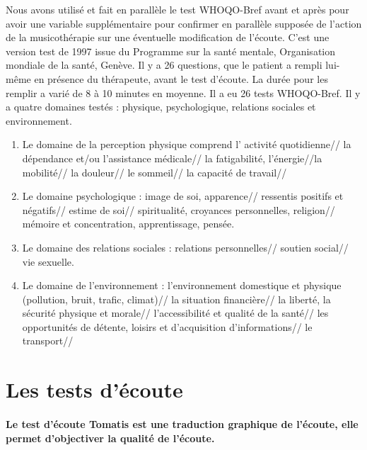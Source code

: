 Nous avons utilisé et fait en parallèle le test WHOQO-Bref avant et
après pour avoir une variable supplémentaire pour confirmer en
parallèle supposée de l'action de la musicothérapie sur une éventuelle modification de l'écoute.  C'est une
version test de 1997 issue du Programme sur la santé mentale,
Organisation mondiale de la santé, Genève. Il y a 26 questions, que le
patient a rempli lui-même en présence du thérapeute, avant le test
d'écoute. La durée pour les remplir a varié de 8 à 10 minutes en
moyenne.  Il a eu 26 tests WHOQO-Bref.
Il y a quatre domaines testés : physique, psychologique, relations sociales et environnement.
\begin{enumerate}
	\item  Le domaine de la perception physique comprend l' activité quotidienne// la dépendance et/ou l'assistance médicale// la fatigabilité, l'énergie//la mobilité// la douleur// le sommeil// la capacité de travail//
	
		 \item Le domaine psychologique :  image de soi, apparence// ressentis positifs et négatifs// estime de soi// spiritualité, croyances personnelles, religion// mémoire et concentration, apprentissage, pensée.
		
			\item Le domaine des relations sociales : relations personnelles// soutien social// vie sexuelle.
			
			\item Le domaine de l'environnement : l'environnement domestique et  physique (pollution, bruit, trafic, climat)// la situation financière//  la liberté, la sécurité physique et morale// l'accessibilité et qualité de la santé// les opportunités de détente, loisirs et d'acquisition d'informations// le transport// 
		\end{enumerate}
		
	


 \section{Les tests d'écoute} 	
 
 \paragraph{Le test d'écoute Tomatis est une traduction graphique de l'écoute, elle permet d'objectiver la qualité de l'écoute.} 
 
